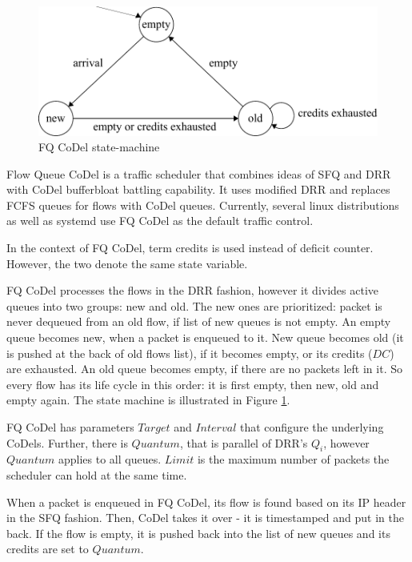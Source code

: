\begin{figure}
	\centering
	\includegraphics[width=137mm]{drawings/fq_codel}
	\caption{FQ CoDel state-machine}
	
	\label{fig06:fqcodel}
\end{figure}

Flow Queue CoDel \cite{fq_codel} is a traffic scheduler that combines ideas of SFQ and DRR with CoDel bufferbloat battling capability. It uses modified DRR and replaces FCFS queues for flows with CoDel queues. Currently, several linux distributions as well as systemd use FQ CoDel as the default traffic control.

In the context of FQ CoDel, term credits is used instead of deficit counter. However, the two denote the same state variable.

FQ CoDel processes the flows in the DRR fashion, however it divides active queues into two groups: new and old. The new ones are prioritized: packet is never dequeued from an old flow, if list of new queues is not empty. An empty queue becomes new, when a packet is enqueued to it. New queue becomes old (it is pushed at the back of old flows list), if it becomes empty, or its credits ($DC$) are exhausted. An old queue becomes empty, if there are no packets left in it. So every flow has its life cycle in this order: it is first empty, then new, old and empty again. The state machine is illustrated in Figure \ref{fig06:fqcodel}.

FQ CoDel has parameters $Target$ and $Interval$ that configure the underlying CoDels. Further, there is $Quantum$, that is parallel of DRR's $Q_i$, however $Quantum$ applies to all queues. $Limit$ is the maximum number of packets the scheduler can hold at the same time.

When a packet is enqueued in FQ CoDel, its flow is found based on its IP header in the SFQ fashion. Then, CoDel takes it over - it is timestamped and put in the back. If the flow is empty, it is pushed back into the list of new queues and its credits are set to $Quantum$.

